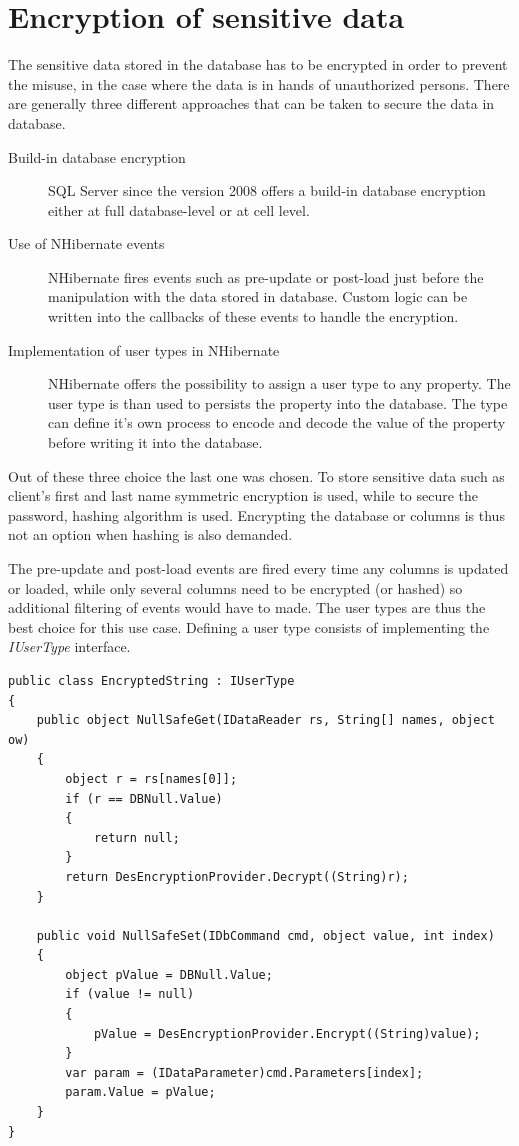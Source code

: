 \section{Encryption of sensitive data}
The sensitive data stored in the database has to be encrypted in order to prevent the misuse, in the case where the data is in hands of unauthorized persons. There are generally three different approaches that can be taken to secure the data in database.

\begin{description}
	\item [Build-in database encryption] SQL Server since the version 2008 offers a build-in database encryption either at full database-level or at cell level.
	\item [Use of NHibernate events] NHibernate fires events such as pre-update or post-load just before the manipulation with the data stored in database. Custom logic can be written into the callbacks of these events to handle the encryption.
	\item [Implementation of user types in NHibernate] NHibernate offers the possibility to assign a user type to any property. The user type is than used to persists the property into the database. The type can define it's own process to encode and decode the value of the property before writing it into the database.
\end{description}

Out of these three choice the last one was chosen. To store sensitive data such as client's first and last name symmetric encryption is used, while to secure the password, hashing algorithm is used. Encrypting the database or columns is thus not an option when hashing is also demanded.

The pre-update and post-load events are fired every time any columns is updated or loaded, while only several columns need to be encrypted (or hashed) so additional filtering of events would have to made. The user types are thus the best choice for this use case. Defining a user type consists of implementing the \textit{IUserType} interface.

\begin{verbatim}
public class EncryptedString : IUserType
{
    public object NullSafeGet(IDataReader rs, String[] names, object ow)
    {
        object r = rs[names[0]];
        if (r == DBNull.Value)
        {
            return null;
        }
        return DesEncryptionProvider.Decrypt((String)r);
    }

    public void NullSafeSet(IDbCommand cmd, object value, int index)
    {
        object pValue = DBNull.Value;
        if (value != null)
        {
            pValue = DesEncryptionProvider.Encrypt((String)value);
        }
        var param = (IDataParameter)cmd.Parameters[index];
        param.Value = pValue;
    }
}
\end{verbatim}

